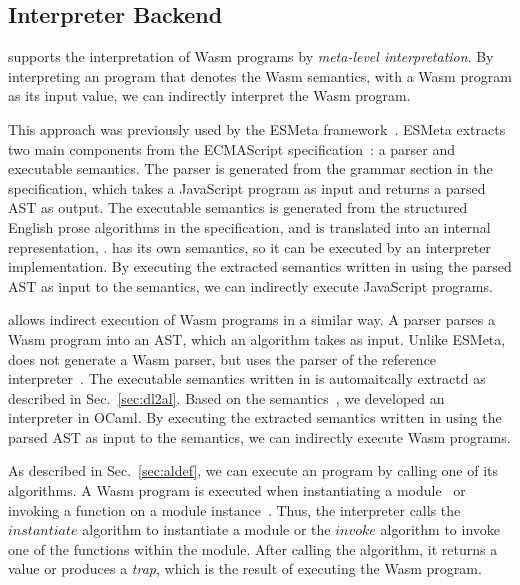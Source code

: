 \subsection{Interpreter Backend}\label{sec:interp} %
\dslname supports the interpretation of Wasm programs by \textit{meta-level interpretation}.
By interpreting an \al program that denotes the Wasm semantics, with
a Wasm program as its input value, we can indirectly interpret the Wasm program.

This approach was previously used by the ESMeta framework~\cite{esmeta,jiset}.
ESMeta extracts two main components from the ECMAScript specification~\cite{ecmascript}:
a parser and executable semantics.
The parser is generated from the grammar section in the specification,
which takes a JavaScript program as input and returns a parsed AST as output.
The executable semantics is generated from the structured English prose algorithms in the specification,
and is translated into an internal representation, \ires.
\ires has its own semantics, so it can be executed by an interpreter implementation.
By executing the extracted semantics written in \ires using the parsed AST as input to the semantics,
we can indirectly execute JavaScript programs.

\dslname allows indirect execution of Wasm programs in a similar way.
A parser parses a Wasm program into an AST, which an \al algorithm takes as input.
Unlike ESMeta, \dslname does not generate a Wasm parser,
but uses the parser of the reference interpreter~\cite{wasmparser}.
The executable semantics written in \al is automaitcally extractd as described in Sec.~\ref{sec:dl2al}.
Based on the \al semantics~\cite{il-tr}, we developed an \al interpreter in OCaml.
By executing the extracted semantics written in \al using the parsed AST as input to the semantics,
we can indirectly execute Wasm programs.

As described in Sec.~\ref{sec:aldef}, we can execute an \al program by calling one of its algorithms.
A Wasm program is executed when instantiating a module~\cite[Sec. 4.5.4]{wasmspec} or
invoking a function on a module instance~\cite[Sec. 4.5.5]{wasmspec}.
Thus, the \al interpreter calls the $\mathit{instantiate}$ algorithm to instantiate a module
or the $\mathit{invoke}$ algorithm to invoke one of the functions within the module.
After calling the algorithm, it returns a value or produces a \textit{trap},
which is the result of executing the Wasm program.

